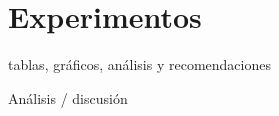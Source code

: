 \newpage
\section{Experimentos}

	
	
	

	
tablas, gráficos, análisis y recomendaciones
	
	Análisis / discusión


	

